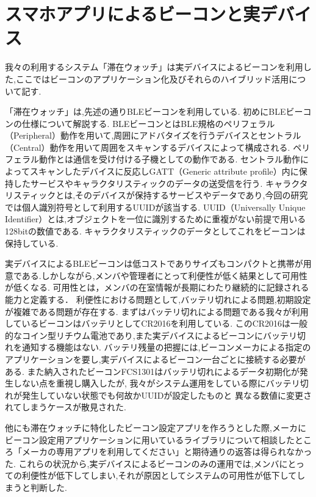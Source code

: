 \section{スマホアプリによるビーコンと実デバイス}\label{4.3}
我々の利用するシステム「滞在ウォッチ」は実デバイスによるビーコンを利用した,ここではビーコンのアプリケーション化及びそれらのハイブリッド活用について記す.

「滞在ウォッチ」は,先述の通りBLEビーコンを利用している.
初めにBLEビーコンの仕様について解説する.
BLEビーコンとはBLE規格のペリフェラル（Peripheral）動作を用いて,周囲にアドバタイズを行うデバイスとセントラル（Central）動作を用いて周囲をスキャンするデバイスによって構成される.
ペリフェラル動作とは通信を受け付ける子機としての動作である.
セントラル動作によってスキャンしたデバイスに反応しGATT（Generic attribute profile）内に保持したサービスやキャラクタリスティックのデータの送受信を行う.
キャラクタリスティックとは,そのデバイスが保持するサービスやデータであり,今回の研究では個人識別符号として利用するUUIDが該当する.
UUID（Universally Unique Identifier）とは,オブジェクトを一位に識別するために重複がない前提で用いる128bitの数値である.
キャラクタリスティックのデータとしてこれをビーコンは保持している.


実デバイスによるBLEビーコンは低コストでありサイズもコンパクトと携帯が用意である.しかしながら,メンバや管理者にとって利便性が低く結果として可用性が低くなる.
可用性とは，メンバの在室情報が長期にわたり継続的に記録される能力と定義する．
利便性における問題として,バッテリ切れによる問題,初期設定が複雑である問題が存在する.
まずはバッテリ切れによる問題である我々が利用しているビーコンはバッテリとしてCR2016を利用している.
このCR2016は一般的なコイン型リチウム電池であり,また実デバイスによるビーコンにバッテリ切れを通知する機能はない.
バッテリ残量の把握には,ビーコンメーカによる指定のアプリケーションを要し,実デバイスによるビーコン一台ごとに接続する必要がある.
また納入されたビーコンFCS1301はバッテリ切れによるデータ初期化が発生しない点を重視し購入したが,
我々がシステム運用をしている際にバッテリ切れが発生していない状態でも何故かUUIDが設定したものと
異なる数値に変更されてしまうケースが散見された.

他にも滞在ウォッチに特化したビーコン設定アプリを作ろうとした際,メーカにビーコン設定用アプリケーションに用いているライブラリについて相談したところ「メーカの専用アプリを利用してください」と期待通りの返答は得られなかった.
これらの状況から,実デバイスによるビーコンのみの運用では,メンバにとっての利便性が低下してしまい,それが原因としてシステムの可用性が低下してしまうと判断した.





